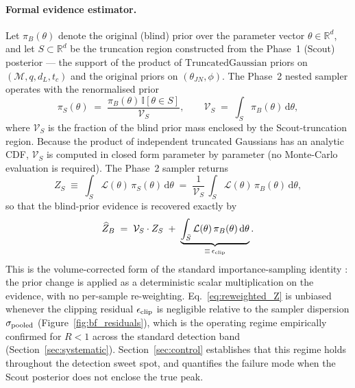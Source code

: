 \documentclass[12pt]{article}
\begin{document}
\paragraph{Formal evidence estimator.}
Let $\pi_B(\theta)$ denote the original (blind) prior over the parameter vector $\theta \in \mathbb{R}^d$, and let $S \subset \mathbb{R}^d$ be the truncation region constructed from the Phase~1 (Scout) posterior --- the support of the product of $\mathrm{TruncatedGaussian}$ priors on $(\mathcal{M},q,d_L,t_c)$ and the original priors on $(\theta_{JN},\phi)$. The Phase~2 nested sampler operates with the renormalised prior
\begin{equation}
    \pi_S(\theta) \;=\; \frac{\pi_B(\theta)\,\mathbb{I}[\theta \in S]}{\mathcal{V}_S},
    \qquad
    \mathcal{V}_S \;=\; \int_{S} \pi_B(\theta)\,\mathrm{d}\theta,
    \label{eq:truncated_prior}
\end{equation}
where $\mathcal{V}_S$ is the fraction of the blind prior mass enclosed by the Scout-truncation region. Because the product of independent truncated Gaussians has an analytic CDF, $\mathcal{V}_S$ is computed in closed form parameter by parameter (no Monte-Carlo evaluation is required). The Phase~2 sampler returns
\begin{equation}
    Z_S \;\equiv\; \int_{S} \mathcal{L}(\theta)\,\pi_S(\theta)\,\mathrm{d}\theta \;=\; \frac{1}{\mathcal{V}_S}\,\int_{S} \mathcal{L}(\theta)\,\pi_B(\theta)\,\mathrm{d}\theta,
\end{equation}
so that the blind-prior evidence is recovered exactly by
\begin{equation}
    \widehat{Z}_B \;=\; \mathcal{V}_S \cdot Z_S \;+\; \underbrace{\int_{\bar S} \mathcal{L}(\theta)\,\pi_B(\theta)\,\mathrm{d}\theta}_{\equiv\,\epsilon_{\rm clip}}.
    \label{eq:reweighted_Z}
\end{equation}
This is the volume-corrected form of the standard importance-sampling identity \cite{Geyer1992, Owen2013}: the prior change is applied as a deterministic scalar multiplication on the evidence, with no per-sample re-weighting. Eq.~\eqref{eq:reweighted_Z} is unbiased whenever the clipping residual $\epsilon_{\rm clip}$ is negligible relative to the sampler dispersion $\sigma_{\rm pooled}$ (Figure~\ref{fig:bf_residuals}), which is the operating regime empirically confirmed for $R < 1$ across the standard detection band (Section~\ref{sec:systematic}). Section~\ref{sec:control} establishes that this regime holds throughout the detection sweet spot, and quantifies the failure mode when the Scout posterior does not enclose the true peak.
\end{document}
